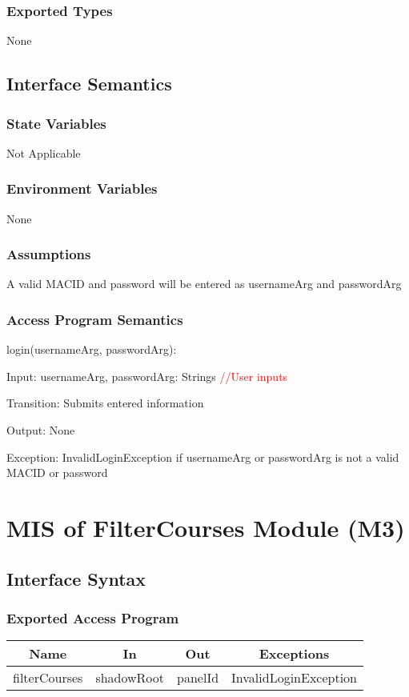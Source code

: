 \documentclass[12pt, titlepage]{article}
\begin{document}
\subsubsection{Exported Types}
None
\subsection{Interface Semantics}
\subsubsection{State Variables}
Not Applicable
\subsubsection{Environment Variables}
None
\subsubsection{Assumptions}
A valid MACID and password will be entered as usernameArg and passwordArg

\subsubsection{Access Program Semantics}
login(usernameArg, passwordArg):

    Input: usernameArg, passwordArg: Strings \textcolor{red}{//User inputs}

    Transition: Submits entered information

    Output: None

    Exception: InvalidLoginException if usernameArg or passwordArg
    is not a valid MACID or password


\newpage




\section{MIS of FilterCourses Module (M3)}
\subsection{Interface Syntax}
\subsubsection{Exported Access Program}
\begin{tabular}[pos]{|c|c|c|c|}
    \hline
    \textbf{Name}& \textbf{In} & \textbf{Out} & \textbf{Exceptions} \\ \hline
    filterCourses & shadowRoot & panelId & InvalidLoginException \\ \hline
\end{tabular}
\end{document}

